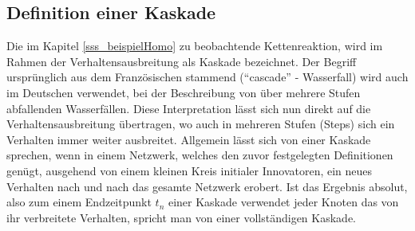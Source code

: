 \documentclass[12pt]{article}
\begin{document}
\subsection{Definition einer Kaskade}
Die im Kapitel \ref{sss_beispielHomo} zu beobachtende Kettenreaktion, wird im Rahmen der Verhaltensausbreitung als Kaskade bezeichnet. Der Begriff ursprünglich aus dem Französischen stammend ("`cascade"' - Wasserfall) wird auch im Deutschen verwendet, bei der Beschreibung von über mehrere Stufen abfallenden Wasserfällen. Diese Interpretation lässt sich nun direkt auf die Verhaltensausbreitung übertragen, wo auch in mehreren Stufen (Steps) sich ein Verhalten immer weiter ausbreitet. Allgemein lässt sich von einer Kaskade sprechen, wenn in einem Netzwerk, welches den zuvor festgelegten Definitionen genügt, ausgehend von einem kleinen Kreis initialer Innovatoren, ein neues Verhalten nach und nach das gesamte Netzwerk erobert. Ist das Ergebnis absolut, also zum einem Endzeitpunkt $t_n$ einer Kaskade verwendet jeder Knoten das von ihr verbreitete Verhalten, spricht man von einer vollständigen Kaskade.
\end{document}

